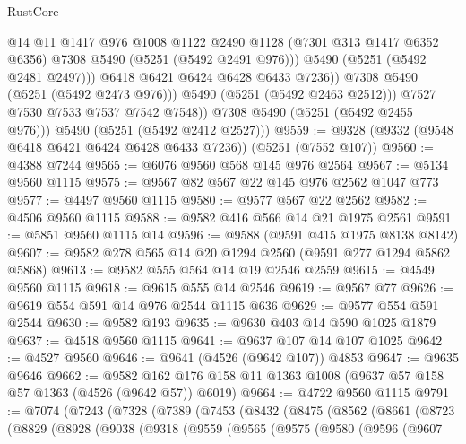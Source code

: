 \begin{lexlean}{RustCore}
\begin{coremodule}
                        @14
                        @11
                        @1417
                        @976
                        @1008
                        @1122
                        @2490
                        @1128
                        (@7301 @313 @1417 @6352 @6356)
                        @7308
                        @5490
                        (@5251 (@5492 @2491 @976)))
                      @5490
                      (@5251 (@5492 @2481 @2497)))
                    @6418
                    @6421
                    @6424
                    @6428
                    @6433
                    @7236))
                @7308
                @5490
                (@5251 (@5492 @2473 @976)))
              @5490
              (@5251 (@5492 @2463 @2512)))
            @7527
            @7530
            @7533
            @7537
            @7542
            @7548))
        @7308
        @5490
        (@5251 (@5492 @2455 @976)))
      @5490
      (@5251 (@5492 @2412 @2527)))
@9559 := @9328 (@9332 (@9548 @6418 @6421 @6424 @6428 @6433 @7236)) (@5251 (@7552 @107))
@9560 := @4388 @7244
@9565 := @6076 @9560 @568 @145 @976 @2564
@9567 := @5134 @9560 @1115
@9575 := @9567 @82 @567 @22 @145 @976 @2562 @1047 @773
@9577 := @4497 @9560 @1115
@9580 := @9577 @567 @22 @2562
@9582 := @4506 @9560 @1115
@9588 := @9582 @416 @566 @14 @21 @1975 @2561
@9591 := @5851 @9560 @1115 @14
@9596 := @9588 (@9591 @415 @1975 @8138 @8142)
@9607 := @9582 @278 @565 @14 @20 @1294 @2560 (@9591 @277 @1294 @5862 @5868)
@9613 := @9582 @555 @564 @14 @19 @2546 @2559
@9615 := @4549 @9560 @1115
@9618 := @9615 @555 @14 @2546
@9619 := @9567 @77
@9626 := @9619 @554 @591 @14 @976 @2544 @1115 @636
@9629 := @9577 @554 @591 @2544
@9630 := @9582 @193
@9635 := @9630 @403 @14 @590 @1025 @1879
@9637 := @4518 @9560 @1115
@9641 := @9637 @107 @14 @107 @1025
@9642 := @4527 @9560
@9646 := @9641 (@4526 (@9642 @107)) @4853
@9647 := @9635 @9646
@9662 := @9582 @162 @176 @158 @11 @1363 @1008 (@9637 @57 @158 @57 @1363 (@4526 (@9642 @57)) @6019)
@9664 := @4722 @9560 @1115
@9791 := @7074
    (@7243
      (@7328
        (@7389
          (@7453
            (@8432
              (@8475
                (@8562
                  (@8661
                    (@8723
                      (@8829
                        (@8928
                          (@9038
                            (@9318
                              (@9559
                                (@9565
                                  (@9575
                                    (@9580
                                      (@9596
                                        (@9607

\end{coremodule}
\end{lexlean}
